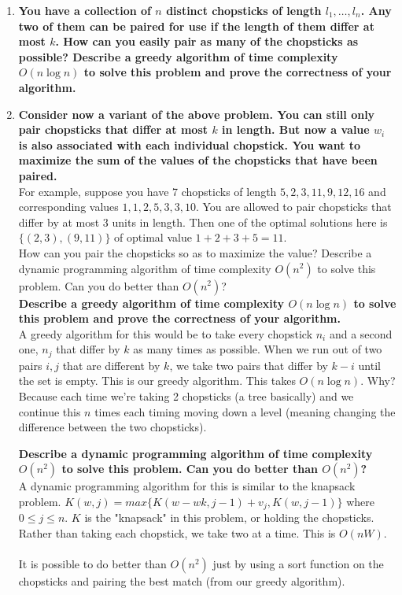 \documentclass[11pt]{article}
\begin{document}
\begin{enumerate}[label=\Alph*.]

\item \textbf{You have a collection of $n$ distinct chopsticks of
length $l_{1},\dots,l_{n}$. Any two of them can be paired for use if
the length of them differ at most $k$. How can you easily pair as many
of the chopsticks as possible? Describe a greedy algorithm of time
complexity $O(n\log n)$ to solve this problem and prove the
correctness of your algorithm.}\\

\item \textbf{Consider now a variant of the above problem. You
can still only pair chopsticks that differ at most $k$ in length. But
now a value $w_{i}$ is also associated with each individual
chopstick. You want to maximize the sum of the values of the
chopsticks that have been paired.}\\

\noindent For example, suppose you have 7 chopsticks of length
$5,2,3,11,9,12,16$ and corresponding values $1,1,2,5,3,3,10$. You are
allowed to pair chopsticks that differ by at most 3 units in
length. Then one of the optimal solutions here is $\{ (2,3),(9,11) \}$
of optimal value $1+2+3+5=11$.\\

\noindent How can you pair the chopsticks so as to maximize the value?
Describe a dynamic programming algorithm of time complexity $O(n^{2})$
to solve this problem. Can you do better than $O(n^{2})$?\\

\noindent \textbf{Describe a greedy algorithm of time
complexity $O(n\log n)$ to solve this problem and prove the
correctness of your algorithm.}\\

A greedy algorithm for this would be to take every chopstick $n_i$ and a second one, $n_j$ that differ by $k$ as many times as possible. When we run out of two pairs $i,j$ that are different by $k$, we take two pairs that differ by $k-i$ until the set is empty. This is our greedy algorithm. This takes $O(n\log n)$. Why? Because each time we're taking 2 chopsticks (a tree basically) and we continue this $n$ times each timing moving down a level (meaning changing the difference between the two chopsticks).

\noindent \textbf{Describe a dynamic programming algorithm of time complexity $O(n^{2})$ to solve this problem. Can you do better than $O(n^{2})$?}\\

A dynamic programming algorithm for this is similar to the knapsack problem. $K(w,j) = max\{K(w-wk,j-1) + v_j,K(w,j-1)\}$ where $0 \leq j \leq n$. $K$ is the "knapsack" in this problem, or holding the chopsticks. Rather than taking each chopstick, we take two at a time. This is $O(nW)$. \\
\\
It is possible to do better than $O(n^2)$ just by using a sort function on the chopsticks and pairing the best match (from our greedy algorithm).

\end{enumerate}
\end{document}
